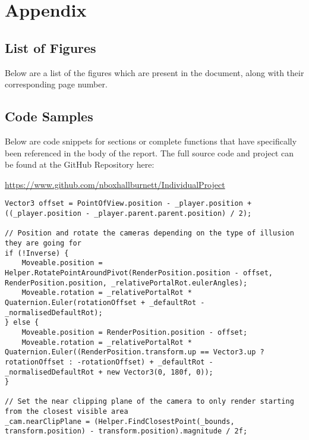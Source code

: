 \chapter{Appendix}
\label{appendix}

\renewcommand\thesection{\Alph{section}}

	\begingroup
		\section{List of Figures}
		\label{appendix:figures}

		Below are a list of the figures which are present in the document, along with their corresponding page number.

		\renewcommand{\chapter}[2]{}		%
		\listoffigures						%
	\endgroup

	\section{Code Samples}
	\label{appendix:code}

		Below are code snippets for sections or complete functions that have specifically been referenced in the body of the report.
		The full source code and project can be found at the GitHub Repository here:

		\url{https://www.github.com/nboxhallburnett/IndividualProject}

		\begin{lstlisting}[caption="Camera Positioning - CameraRenderPosition.cs", label=appendix:code:camera, firstnumber=85]
Vector3 offset = PointOfView.position - _player.position + ((_player.position - _player.parent.parent.position) / 2);

// Position and rotate the cameras depending on the type of illusion they are going for
if (!Inverse) {
	Moveable.position = Helper.RotatePointAroundPivot(RenderPosition.position - offset, RenderPosition.position, _relativePortalRot.eulerAngles);
	Moveable.rotation = _relativePortalRot * Quaternion.Euler(rotationOffset + _defaultRot - _normalisedDefaultRot);
} else {
	Moveable.position = RenderPosition.position - offset;
	Moveable.rotation = _relativePortalRot * Quaternion.Euler((RenderPosition.transform.up == Vector3.up ? rotationOffset : -rotationOffset) + _defaultRot - _normalisedDefaultRot + new Vector3(0, 180f, 0));
}

// Set the near clipping plane of the camera to only render starting from the closest visible area
_cam.nearClipPlane = (Helper.FindClosestPoint(_bounds, transform.position) - transform.position).magnitude / 2f;
		\end{lstlisting}

